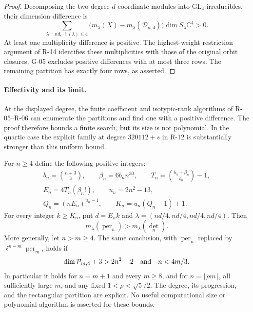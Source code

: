 \begin{proof}
Decomposing the two degree-$d$ coordinate modules into
$\mathrm{GL}_4$ irreducibles, their dimension difference is
\[
 \sum_{\lambda\vdash nd,\,\ell(\lambda)\leq4}
 \bigl(m_\lambda(X)-m_\lambda(\mathcal D_{n,4})\bigr)
 \dim S_\lambda\mathbb C^4>0.
\]
At least one multiplicity difference is positive. The
highest-weight restriction argument of R-14 identifies these
multiplicities with those of the original orbit closures.
G-05 excludes positive differences with at most three rows.
The remaining partition has exactly four rows, as asserted.
\end{proof}
\paragraph{Effectivity and its limit.}
At the displayed degree, the finite coefficient and isotypic-rank
algorithms of R-05--R-06 can enumerate the partitions and find one
with a positive difference. The proof therefore bounds a finite
search, but its size is not polynomial. In the quartic case the
explicit family at degree $320112+s$ in R-12 is substantially
stronger than this uniform bound.


\begin{proposition}\label{G-11}
For $n\geq4$ define the following positive integers:
\[
\begin{gathered}
 b_n=\binom{n+3}{3},\qquad \beta_n=6b_n n^{30},\qquad
 T_n=\binom{b_n+\beta_n}{b_n}-1,\\
 E_n=4T_n(\beta_n!),\qquad u_n=2n^2-13,\\
 Q_n=(nE_n)^{u_n-1},\qquad K_n=u_n(Q_n-1)+1.
\end{gathered}
\]
For every integer $k\geq K_n$, put $d=E_n k$ and
$\lambda=(nd/4,nd/4,nd/4,nd/4)$. Then
\begin{equation}\label{G11:rectangle}
 m_\lambda(\operatorname{per}_n)>m_\lambda(\det_n).
\end{equation}
More generally, let $n>m\geq4$. The same conclusion, with
$\operatorname{per}_n$ replaced by
$\ell^{n-m}\operatorname{per}_m$, holds if
\begin{equation}\label{G11:padded-hypotheses}
 \dim\mathcal P_{m,4}+3>2n^2+2
 \quad\hbox{and}\quad n<4m/3.
\end{equation}
In particular it holds for $n=m+1$ and every $m\geq8$, and
for $n=\lfloor\rho m\rfloor$, all sufficiently large $m$,
and any fixed $1<\rho<\sqrt5/2$.
The degree, its progression, and the rectangular partition are
explicit. No useful computational size or polynomial algorithm
is asserted for these bounds.
\end{proposition}
